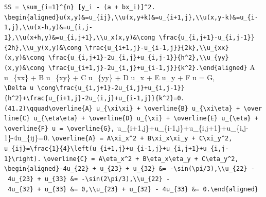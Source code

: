 \documentclass[
  ukrainian,
]{article}
\begin{document}
\texttt{SS\ =\ \textbackslash{}sum\_\{i=1\}\^{}\{n\}\ {[}y\_i\ -\ (a\ +\ bx\_i){]}\^{}2.}
\texttt{\textbackslash{}begin\{aligned\}u(x,y)\&=u\_\{ij\},\textbackslash{}\textbackslash{}u(x,y+k)\&=u\_\{i+1,j\},\textbackslash{}\textbackslash{}u(x,y-k)\&=u\_\{i-1,j\},\textbackslash{}\textbackslash{}u(x-h,y)\&=u\_\{i,j-1\},\textbackslash{}\textbackslash{}u(x+h,y)\&=u\_\{i,j+1\},\textbackslash{}\textbackslash{}u\_x(x,y)\&\textbackslash{}cong\ \textbackslash{}frac\{u\_\{i,j+1\}-u\_\{i,j-1\}\}\{2h\},\textbackslash{}\textbackslash{}u\_y(x,y)\&\textbackslash{}cong\ \textbackslash{}frac\{u\_\{i+1,j\}-u\_\{i-1,j\}\}\{2k\},\textbackslash{}\textbackslash{}u\_\{xx\}(x,y)\&\textbackslash{}cong\ \textbackslash{}frac\{u\_\{i,j+1\}-2u\_\{i,j\}+u\_\{i,j-1\}\}\{h\^{}2\},\textbackslash{}\textbackslash{}u\_\{yy\}(x,y)\&\textbackslash{}cong\ \textbackslash{}frac\{u\_\{i+1,j\}-2u\_\{i,j\}+u\_\{i-1,j\}\}\{k\^{}2\}.\textbackslash{}end\{aligned\}}
A u\_\{xx\} + B u\_\{xy\} + C u\_\{yy\} + D u\_x + E u\_y + F u = G,
\texttt{\textbackslash{}Delta\ u\ \textbackslash{}cong\textbackslash{}frac\{u\_\{i,j+1\}-2u\_\{i,j\}+u\_\{i,j-1\}\}\{h\^{}2\}+\textbackslash{}frac\{u\_\{i+1,j\}-2u\_\{i,j\}+u\_\{i-1,j\}\}\{k\^{}2\}=0.}
\texttt{(41.2)\textbackslash{}qquad\textbackslash{}overline\{A\}\ u\_\{\textbackslash{}xi\textbackslash{}xi\}\ +\ \textbackslash{}overline\{B\}\ u\_\{\textbackslash{}xi\textbackslash{}eta\}\ +\ \textbackslash{}overline\{C\}\ u\_\{\textbackslash{}eta\textbackslash{}eta\}\ +\ \textbackslash{}overline\{D\}\ u\_\{\textbackslash{}xi\}\ +\ \textbackslash{}overline\{E\}\ u\_\{\textbackslash{}eta\}\ +\ \textbackslash{}overline\{F\}\ u\ =\ \textbackslash{}overline\{G\},}
u\_\{i+1,j\}+u\_\{i-1,j\}+u\_\{i,j+1\}+u\_\{i,j-1\}-4u\_\{ij\}=0.
\texttt{\textbackslash{}overline\{A\}\ =\ A\textbackslash{}xi\_x\^{}2\ +\ B\textbackslash{}xi\_x\textbackslash{}xi\_y\ +\ C\textbackslash{}xi\_y\^{}2,}
\texttt{u\_\{ij\}=\textbackslash{}frac\{1\}\{4\}\textbackslash{}left(u\_\{i+1,j\}+u\_\{i-1,j\}+u\_\{i,j+1\}+u\_\{i,j-1\}\textbackslash{}right).}
\texttt{\textbackslash{}overline\{C\}\ =\ A\textbackslash{}eta\_x\^{}2\ +\ B\textbackslash{}eta\_x\textbackslash{}eta\_y\ +\ C\textbackslash{}eta\_y\^{}2,}
\texttt{\textbackslash{}begin\{aligned\}-4u\_\{22\}\ +\ u\_\{23\}\ +\ u\_\{32\}\ \&=\ -\textbackslash{}sin(\textbackslash{}pi/3),\textbackslash{}\textbackslash{}u\_\{22\}\ -\ 4u\_\{23\}\ +\ u\_\{33\}\ \&=\ -\textbackslash{}sin(2\textbackslash{}pi/3),\textbackslash{}\textbackslash{}u\_\{22\}\ -\ 4u\_\{32\}\ +\ u\_\{33\}\ \&=\ 0,\textbackslash{}\textbackslash{}u\_\{23\}\ +\ u\_\{32\}\ -\ 4u\_\{33\}\ \&=\ 0.\textbackslash{}end\{aligned\}}
\end{document}
